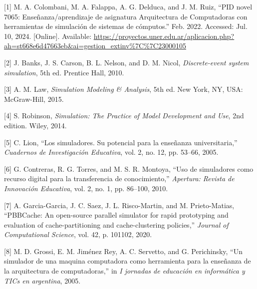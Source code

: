 \documentclass[12pt,oneside]{templates/unerthesis}
\newcommand{\CSLLeftMargin}[1]{#1} %
\newcommand{\CSLRightInline}[1]{#1} %
\newlength{\cslhangindent}
\newenvironment{CSLReferences}[2] %
 {\setlength{\parindent}{0pt}%
  \setlength{\leftskip}{#1 pt\relax}%
  \setlength{\parskip}{#2 pt\relax}%
  \everypar{\setlength{\hangindent}{\cslhangindent}}}
 {\par}
\begin{document}
\hypertarget{refs}{}
\begin{CSLReferences}{0}{0}
\leavevmode{}%
\CSLLeftMargin{{[}1{]} }%
\CSLRightInline{M. A. Colombani, M. A. Falappa, A. G. Delduca, and J. M. Ruiz, {``{PID} novel 7065: {Enseñanza}/aprendizaje de asignatura {Arquitectura} de {Computadoras} con herramientas de simulación de sistemas de cómputos.''} Feb. 2022. Accessed: Jul. 10, 2024. {[}Online{]}. Available: \url{https://proyectos.uner.edu.ar/aplicacion.php?ah=st668e6d47663eb&ai=gestion_extinv\%7C\%7C23000105}}

\leavevmode{}%
\CSLLeftMargin{{[}2{]} }%
\CSLRightInline{J. Banks, J. S. Carson, B. L. Nelson, and D. M. Nicol, \emph{Discrete-event system simulation}, 5th ed. Prentice Hall, 2010.}

\leavevmode{}%
\CSLLeftMargin{{[}3{]} }%
\CSLRightInline{A. M. Law, \emph{Simulation {Modeling} \& {Analysis}}, 5th ed. New York, NY, USA: McGraw-Hill, 2015.}

\leavevmode{}%
\CSLLeftMargin{{[}4{]} }%
\CSLRightInline{S. Robinson, \emph{Simulation: {The} {Practice} of {Model} {Development} and {Use}}, 2nd edition. Wiley, 2014.}

\leavevmode{}%
\CSLLeftMargin{{[}5{]} }%
\CSLRightInline{C. Lion, {``Los simuladores. {Su} potencial para la enseñanza universitaria,''} \emph{Cuadernos de Investigación Educativa}, vol. 2, no. 12, pp. 53--66, 2005.}

\leavevmode{}%
\CSLLeftMargin{{[}6{]} }%
\CSLRightInline{G. Contreras, R. G. Torres, and M. S. R. Montoya, {``Uso de simuladores como recurso digital para la transferencia de conocimiento,''} \emph{Apertura: Revista de Innovación Educativa}, vol. 2, no. 1, pp. 86--100, 2010.}

\leavevmode{}%
\CSLLeftMargin{{[}7{]} }%
\CSLRightInline{A. Garcia-Garcia, J. C. Saez, J. L. Risco-Martin, and M. Prieto-Matias, {``{PBBCache}: {An} open-source parallel simulator for rapid prototyping and evaluation of cache-partitioning and cache-clustering policies,''} \emph{Journal of Computational Science}, vol. 42, p. 101102, 2020.}

\leavevmode{}%
\CSLLeftMargin{{[}8{]} }%
\CSLRightInline{M. D. Grossi, E. M. Jiménez Rey, A. C. Servetto, and G. Perichinsky, {``Un simulador de una maquina computadora como herramienta para la enseñanza de la arquitectura de computadoras,''} in \emph{I jornadas de educación en informática y TICs en argentina}, 2005.}


\end{CSLReferences}
\end{document}
